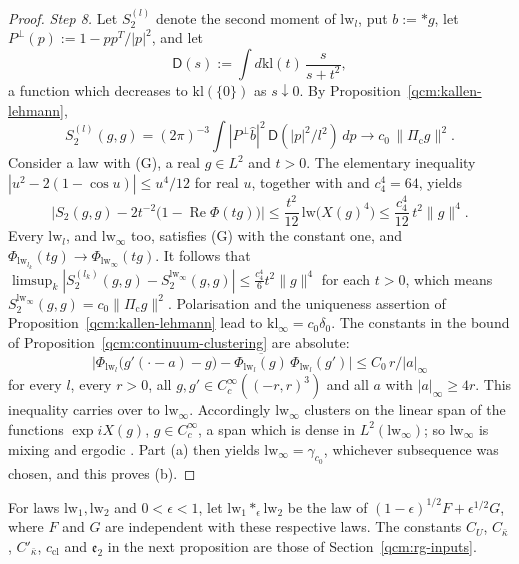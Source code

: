 \documentclass[11pt,letterpaper,reqno]{amsart}
\theoremstyle{definition}
\begin{document}
\begin{proof}
\emph{Step 8.}
Let $S_2^{(l)}$ denote the second moment of $\mathrm{lw}_l$, put $b:=\ast g$, let $P^\perp(p):=1-pp^T/|p|^2$, and let
\begin{equation*}
\mathsf D(s):=\int d\mathrm{kl}(t)\,\frac{s}{s+t^2},
\end{equation*}
a function which decreases to $\mathrm{kl}(\{0\})$ as $s\downarrow0$.
By Proposition~\ref{qcm:kallen-lehmann},
\begin{equation*}
S_2^{(l)}(g,g)=(2\pi)^{-3}\int|P^\perp\hat b|^2\,\mathsf D(|p|^2/l^2)\,dp\longrightarrow c_0\,\|\Pi_{\mathrm c}g\|^2.
\end{equation*}
Consider a law with (G), a real $g\in L^2$ and $t>0$.
The elementary inequality $|u^2-2(1-\cos u)|\le u^4/12$ for real $u$, together with \cite[Proposition~5.1]{QEDConstruction} and $c_4^4=64$, yields
\begin{equation*}
\bigl|S_2(g,g)-2t^{-2}\bigl(1-\operatorname{Re}\Phi(tg)\bigr)\bigr|\le\frac{t^2}{12}\,\mathrm{lw}\bigl(X(g)^4\bigr)\le\frac{c_4^4}{12}\,t^2\|g\|^4.
\end{equation*}
Every $\mathrm{lw}_l$, and $\mathrm{lw}_\infty$ too, satisfies (G) with the constant one, and $\Phi_{\mathrm{lw}_{l_k}}(tg)\to\Phi_{\mathrm{lw}_\infty}(tg)$.
It follows that $\limsup_k|S_2^{(l_k)}(g,\allowbreak g)-S_2^{\mathrm{lw}_\infty}(g,\allowbreak g)|\le\frac{c_4^4}6t^2\|g\|^4$ for each $t>0$, which means $S_2^{\mathrm{lw}_\infty}(g,g)=c_0\|\Pi_{\mathrm c}g\|^2$.
Polarisation and the uniqueness assertion of Proposition~\ref{qcm:kallen-lehmann} lead to $\mathrm{kl}_\infty=c_0\delta_0$.
The constants in the bound of Proposition~\ref{qcm:continuum-clustering} are absolute:
\begin{equation*}
\bigl|\Phi_{\mathrm{lw}_l}\bigl(g'(\cdot-a)-g\bigr)-\overline{\Phi_{\mathrm{lw}_l}(g)}\,\Phi_{\mathrm{lw}_l}(g')\bigr|\le C_0\,r/|a|_\infty
\end{equation*}
for every $l$, every $r>0$, all $g,g'\in C_c^\infty((-r,r)^3)$ and all $a$ with $|a|_\infty\ge4r$.
This inequality carries over to $\mathrm{lw}_\infty$.
Accordingly $\mathrm{lw}_\infty$ clusters on the linear span of the functions $\exp iX(g)$, $g\in C_c^\infty$, a span which is dense in $L^2(\mathrm{lw}_\infty)$; so $\mathrm{lw}_\infty$ is mixing and ergodic \cite[Sections~5.2 and~7.4]{QEDConstruction}.
Part (a) then yields $\mathrm{lw}_\infty=\gamma_{c_0}$, whichever subsequence was chosen, and this proves (b).
\end{proof}
For laws $\mathrm{lw}_1,\mathrm{lw}_2$ and $0<\epsilon<1$, let
$\mathrm{lw}_1\ast_\epsilon\mathrm{lw}_2$ be the law of
$(1-\epsilon)^{1/2}F+\epsilon^{1/2}G$, where $F$ and $G$ are independent
with these respective laws.
The constants $C_U$, $C_{\bar\kappa}$, $C'_{\bar\kappa}$,
$c_{\mathrm{cl}}$ and $\mathfrak e_2$ in the next proposition are those of
Section~\ref{qcm:rg-inputs}.
\end{document}
